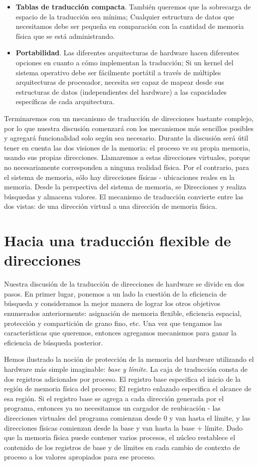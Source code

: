 \documentclass[10pt]{book}
\begin{document}
\begin{itemize}
\item \textbf{Tablas de traducción compacta}. También queremos que la sobrecarga de espacio de la traducción sea mínima; Cualquier estructura de datos que necesitamos debe ser pequeña en comparación con la cantidad de memoria física que se está administrando.

\item \textbf{Portabilidad}. Las diferentes arquitecturas de hardware hacen diferentes opciones en cuanto a cómo implementan la traducción; Si un kernel del sistema operativo debe ser fácilmente portátil a través de múltiples arquitecturas de procesador, necesita ser capaz de mapear desde sus estructuras de datos (independientes del hardware) a las capacidades específicas de cada arquitectura.
\end{itemize}

Terminaremos con un mecanismo de traducción de direcciones bastante complejo, por lo que nuestra discusión comenzará con los mecanismos más sencillos posibles y agregará funcionalidad solo según sea necesario. Durante la discusión será útil tener en cuenta las dos visiones de la memoria: el proceso ve su propia memoria, usando sus propias direcciones. Llamaremos a estas direcciones virtuales, porque no necesariamente corresponden a ninguna realidad física. Por el contrario, para el sistema de memoria, sólo hay direcciones físicas - ubicaciones reales en la memoria. Desde la perspectiva del sistema de memoria, se
Direcciones y realiza búsquedas y almacena valores. El mecanismo de traducción convierte entre las dos vistas: de una dirección virtual a una dirección de memoria física.

\section{Hacia una traducción flexible de direcciones}
Nuestra discusión de la traducción de direcciones de hardware se divide en dos pasos. En primer lugar, ponemos a un lado la cuestión de la eficiencia de búsqueda y consideramos la mejor manera de lograr los otros objetivos enumerados anteriormente: asignación de memoria flexible, eficiencia espacial, protección y compartición de grano fino, etc. Una vez que tengamos las características que queremos, entonces agregamos mecanismos para ganar la eficiencia de búsqueda posterior.

Hemos ilustrado la noción de protección de la memoria del hardware utilizando el hardware más simple imaginable: \textit{base y límite}. La caja de traducción consta de dos registros adicionales por proceso. El registro base especifica el inicio de la región de memoria física del proceso; El registro enlazado especifica el alcance de esa región. Si el registro base se agrega a cada dirección generada por el programa, entonces ya no necesitamos un cargador de reubicación - las direcciones virtuales del programa comienzan desde 0 y van hasta el límite, y las direcciones físicas comienzan desde la base y van hasta la base $+$ límite. Dado que la memoria física puede contener varios procesos, el núcleo restablece el contenido de los registros de base y de límites en cada cambio de contexto de proceso a los valores apropiados para ese proceso.
\end{document}
